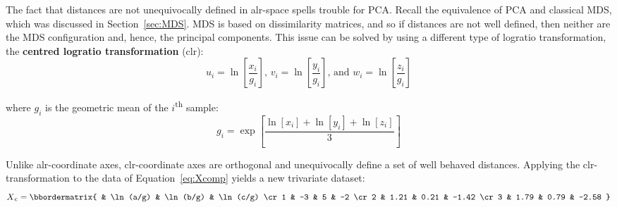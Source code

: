 The fact that distances are not unequivocally defined in alr-space
spells trouble for PCA. Recall the equivalence of PCA and classical
MDS, which was discussed in Section~\ref{sec:MDS}. MDS is based on
dissimilarity matrices, and so if distances are not well defined, then
neither are the MDS configuration and, hence, the principal
components. This issue can be solved by using a different type of
logratio transformation, the \textbf{centred logratio transformation}
(clr):
\begin{equation}
  u_i = \ln\!\left[\frac{x_i}{g_i}\right] \mbox{,~}
  v_i = \ln\!\left[\frac{y_i}{g_i}\right] \mbox{,~and~}
  w_i = \ln\!\left[\frac{z_i}{g_i}\right]
  \label{eq:clr}
\end{equation}

\noindent where $g_i$ is the geometric mean of the
$i$\textsuperscript{th} sample:
\[
g_i = \exp\!\left[\frac{\ln[x_i]+\ln[y_i]+\ln[z_i]}{3}\right]
\]

Unlike alr-coordinate axes, clr-coordinate axes are orthogonal and
unequivocally define a set of well behaved distances. Applying the
clr-transformation to the data of Equation~\ref{eq:Xcomp} yields a new
trivariate dataset:
\begin{equation}
  X\textsubscript{c} =
  \bbordermatrix{ & \ln(a/g) & \ln(b/g) & \ln(c/g) \cr
    1 & -3 & 5 & -2 \cr
    2 & 1.21  & 0.21 & -1.42 \cr
    3 & 1.79  & 0.79 & -2.58
  }
  \label{eq:Xc}
\end{equation}


